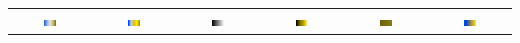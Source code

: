 \documentclass{llncs}
\begin{document}
\begin{plate*}
\begin{tabular}{c@{\,}c@{\,}c@{\,}c@{\,}c@{\,}c}
    \includegraphics[width=0.16\textwidth]{images/Cool2WarmDeuteranope} &
    \includegraphics[width=0.16\textwidth]{images/RainbowDeuteranope} &
    \includegraphics[width=0.16\textwidth]{images/GrayscaleDeuteranope} &
    \includegraphics[width=0.16\textwidth]{images/BlackBodyDeuteranope} &
    \includegraphics[width=0.16\textwidth]{images/Green2RedDeuteranope} &
    \includegraphics[width=0.16\textwidth]{images/Blue2YellowDeuteranope} \\


\end{tabular}
\end{plate*}
\end{document}
